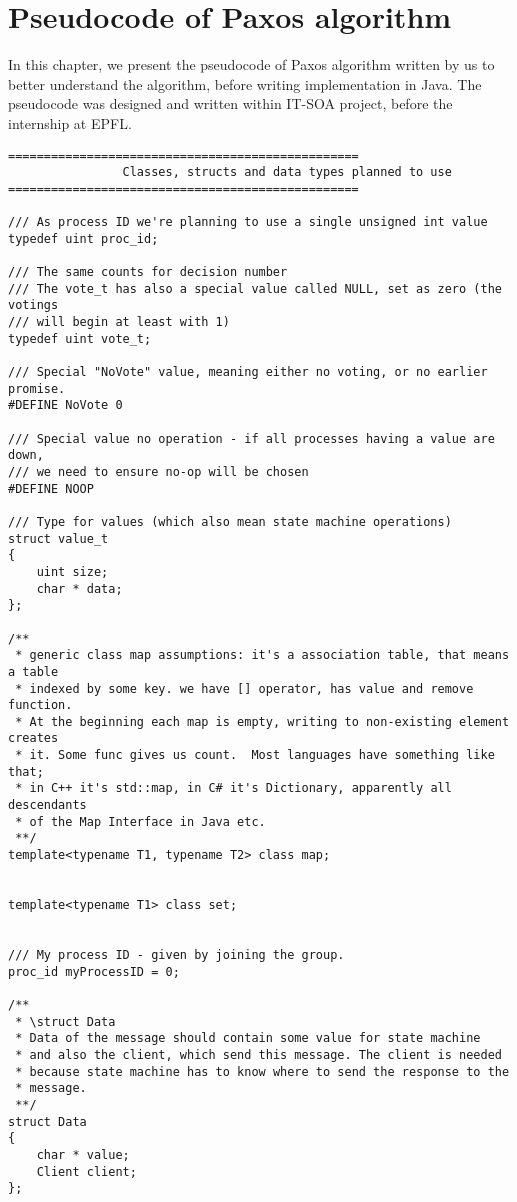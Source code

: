\chapter{Pseudocode of Paxos algorithm}

In this chapter, we present the pseudocode of Paxos algorithm written by us to
better understand the algorithm, before writing implementation in Java. The
pseudocode was designed and written within IT-SOA project, before the
internship at EPFL.
{

\lstset{basicstyle=\tiny\ttfamily}

\begin{lstlisting}[frame=lines,caption=Pseudocode of Paxos algorithm]
=================================================
                Classes, structs and data types planned to use
=================================================

/// As process ID we're planning to use a single unsigned int value
typedef uint proc_id;

/// The same counts for decision number
/// The vote_t has also a special value called NULL, set as zero (the votings
/// will begin at least with 1)
typedef uint vote_t;

/// Special "NoVote" value, meaning either no voting, or no earlier promise.
#DEFINE NoVote 0

/// Special value no operation - if all processes having a value are down,
/// we need to ensure no-op will be chosen
#DEFINE NOOP

/// Type for values (which also mean state machine operations)
struct value_t
{
	uint size;
	char * data;
};

/**
 * generic class map assumptions: it's a association table, that means a table
 * indexed by some key. we have [] operator, has value and remove function.
 * At the beginning each map is empty, writing to non-existing element creates
 * it. Some func gives us count.  Most languages have something like that;
 * in C++ it's std::map, in C# it's Dictionary, apparently all descendants
 * of the Map Interface in Java etc.
 **/
template<typename T1, typename T2> class map;


template<typename T1> class set;


/// My process ID - given by joining the group.
proc_id myProcessID = 0;

/**
 * \struct Data
 * Data of the message should contain some value for state machine 
 * and also the client, which send this message. The client is needed
 * because state machine has to know where to send the response to the 
 * message.
 **/
struct Data
{
	char * value;
	Client client;
};


\end{lstlisting}}
